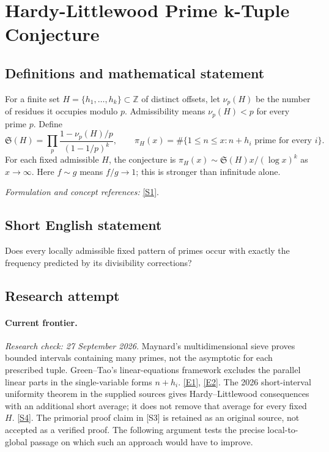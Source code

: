 \documentclass[11pt,a4paper]{article}
\newcommand{\Z}{\mathbb{Z}}
\newcommand{\sref}[2]{\hyperlink{source:#1:#2}{[S#2]}}
\newcommand{\eref}[2]{\hyperlink{extra:#1:#2}{[E#2]}}
\newif\ifshowcatalogue
\newcommand{\cataloguescope}[1]{\ifshowcatalogue
 \paragraph{Exact scope in the supplied catalogue.}
 \begin{quote}\small #1\end{quote}\fi}
\begin{document}
\setcounter{section}{0}
\clearpage
\section*{\texorpdfstring{Hardy-Littlewood Prime k-Tuple Conjecture}{Hardy-Littlewood Prime k-Tuple Conjecture}}\label{30006682}
\subsection{Definitions and mathematical statement}
For a finite set $H=\{h_1,\ldots,h_k\}\subset\Z$ of distinct offsets, let $\nu_p(H)$ be the number of residues it occupies modulo $p$. Admissibility means $\nu_p(H)<p$ for every prime $p$. Define
\[
 \mathfrak S(H)=\prod_p\frac{1-\nu_p(H)/p}{(1-1/p)^k},\qquad
 \pi_H(x)=\#\{1\le n\le x:n+h_i\text{ prime for every }i\}.
\]
For each fixed admissible $H$, the conjecture is $\pi_H(x)\sim\mathfrak S(H)x/(\log x)^k$ as $x\to\infty$. Here $f\sim g$ means $f/g\to1$; this is stronger than infinitude alone.
\par\smallskip\textit{Formulation and concept references:} \sref{30006682}{1}.
\cataloguescope{For every finite admissible set H=\{h\_1,...,h\_k\} of distinct integers, prove that the number of n <= x for which every n+h\_i is prime is asymptotic to S(H)x/(log x)\textasciicircum{}k, where S(H) is the Hardy-Littlewood singular series, or disprove this formula.}
\subsection{Short English statement}
Does every locally admissible fixed pattern of primes occur with exactly the frequency predicted by its divisibility corrections?
\subsection{Research attempt}
\paragraph{Current frontier.}
\textit{Research check: 27 September 2026.}
Maynard's multidimensional sieve proves bounded intervals containing many
primes, not the asymptotic for each prescribed tuple. Green--Tao's
linear-equations framework excludes the parallel linear parts in the
single-variable forms $n+h_i$. \eref{30006682}{1}, \eref{30006682}{2}.
The 2026 short-interval uniformity theorem in the supplied sources gives
Hardy--Littlewood consequences with an additional short average; it does
not remove that average for every fixed $H$. \sref{30006682}{4}.
The primorial proof claim in [S3] is retained as an original source, not
accepted as a verified proof. The following argument tests the precise
local-to-global passage on which such an approach would have to improve.
\end{document}
